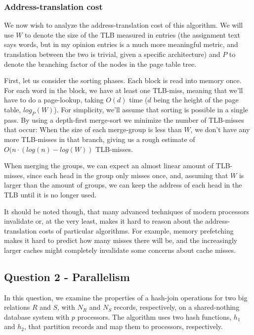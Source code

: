 \documentclass[a4paper, 12pt]{article}
\begin{document}
\subsubsection*{Address-translation cost}


We now wish to analyze the address-translation cost of this
algorithm. We will use $W$ to denote the size of the TLB measured in
entries (the assignment text says words, but in my opinion entries is
a much more meaningful metric, and translation between the two is
trivial, given a specific architecture) and $P$ to denote the
branching factor of the nodes in the page table tree.

First, let us consider the sorting phases. Each block is read into
memory once. For each word in the block, we have at least one
TLB-miss, meaning that we'll have to do a page-lookup, taking $O(d)$
time ($d$ being the height of the page table, $log_P(W)$). For
simplicity, we'll assume that sorting is possible in a single pass. By
using a depth-first merge-sort we minimize the number of TLB-misses
that occur: When the size of each merge-group is less than $W$, we
don't have any more TLB-misses in that branch, giving us a rough
estimate of $O(n\cdot (log (n) - log(W))$ TLB-misses.

When merging the groups, we can expect an almost linear amount of
TLB-misses, since each head in the group only misses once, and,
assuming that $W$ is larger than the amount of groups, we can keep the
address of each head in the TLB until it is no longer used.

It should be noted though, that many advanced techniques of modern
processors invalidate or, at the very least, makes it hard to reason
about the address-translation costs of particular algorithms. For
example, memory prefetching makes it hard to predict how many misses
there will be, and the increasingly larger caches might completely
invalidate some concerns about cache misses.

\subsection*{Question 2 - Parallelism}

In this question, we examine the properties of a hash-join operations
for two big relations $R$ and $S$, with $N_R$ and $N_S$ records,
respectively, on a shared-nothing database system with $p$
processors. The algorithm uses two hash functions, $h_1$ and $h_2$,
that partition records and map them to processors, respectively.
\end{document}
